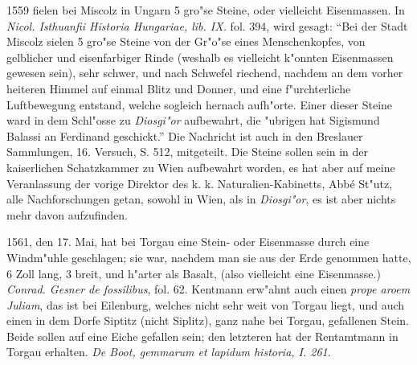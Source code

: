 \documentclass[a4paper, 11pt, oneside, polutonikogreek, german]{article}
\begin{document}
1559 fielen bei Miscolz in Ungarn 5 gro"se Steine, oder vielleicht Eisenmassen. In \emph{Nicol. Isthuanfii Historia Hungariae, lib. IX.} fol. 394, wird gesagt: "`Bei der Stadt Miscolz sielen 5 gro"se Steine von der Gr"o"se eines Menschenkopfes, von gelblicher und eisenfarbiger Rinde (weshalb es vielleicht k"onnten Eisenmassen gewesen sein), sehr schwer, und nach Schwefel riechend, nachdem an dem vorher heiteren Himmel auf einmal Blitz und Donner, und eine f"urchterliche Luftbewegung entstand, welche sogleich hernach aufh"orte. Einer dieser Steine ward in dem Schl"osse zu \emph{Diosgi"or} aufbewahrt, die "ubrigen hat Sigismund Balassi an Ferdinand geschickt."' Die Nachricht ist auch in den Breslauer Sammlungen, 16. Versuch, S. 512, mitgeteilt. Die Steine sollen sein in der kaiserlichen Schatzkammer zu Wien aufbewahrt worden, es hat aber auf meine Veranlassung der vorige Direktor des k. k. Naturalien-Kabinetts, Abbé St"utz, alle Nachforschungen getan, sowohl in Wien, als in \emph{Diosgi"or}, es ist aber nichts mehr davon aufzufinden.

1561, den 17. Mai, hat bei Torgau eine Stein- oder Eisenmasse durch eine Windm"uhle geschlagen; sie war, nachdem man sie aus der Erde genommen hatte, 6 Zoll lang, 3 breit, und h"arter als Basalt, (also vielleicht eine Eisenmasse.) \emph{Conrad. Gesner de fossilibus}, fol. 62. Kentmann erw"ahnt auch einen \emph{prope aroem Juliam}, das ist bei Eilenburg, welches nicht sehr weit von Torgau liegt, und auch einen in dem Dorfe Siptitz (nicht Siplitz), ganz nahe bei Torgau, gefallenen Stein. Beide sollen auf eine Eiche gefallen sein; den letzteren hat der Rentamtmann in Torgau erhalten. \emph{De Boot, gemmarum et lapidum historia, I. 261}.
\end{document}
